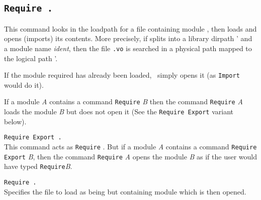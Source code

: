 \subsection{\tt Require {\dirpath}.}
\label{Require}

This command looks in the loadpath for a file containing module
{\dirpath}, then loads and opens (imports) its contents.
More precisely, if {\dirpath} splits into a library dirpath {\dirpath'} and a module name {\textsl{ident}}, then the file {\ident}{\tt .vo} is searched in a physical path mapped to the logical path {\dirpath'}.

If the module required has already been loaded, \Coq\ 
simply opens it (as {\tt Import {\dirpath}} would do it).

If a module {\it A} contains a command {\tt Require} {\it B} then the
command {\tt Require} {\it A} loads the module {\it B} but does not
open it (See the {\tt Require Export} variant below).

\begin{Variants}
\item {\tt Require Export {\qualid}.}\\
  This command acts as {\tt Require} {\qualid}.  But if a module {\it
    A} contains a command {\tt Require Export} {\it B}, then the
  command {\tt Require} {\it A} opens the module {\it B} as if the
  user would have typed {\tt Require}{\it B}.

\item {\tt Require {\qualid} {\str}.}\\ 
  Specifies the file to load as being {\str} but containing module
  {\qualid} which is then opened.
\end{Variants}

